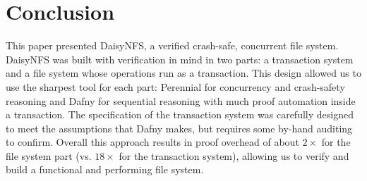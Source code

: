 \section{Conclusion}

This paper presented DaisyNFS, a verified crash-safe,
concurrent file system. DaisyNFS was built with verification in mind in
two parts: a transaction system and a file system whose operations run
as a transaction. This design allowed us to use the sharpest tool for
each part: Perennial for concurrency and crash-safety reasoning and
Dafny for sequential reasoning with much proof automation inside a
transaction.  The specification of the transaction system was
carefully designed to meet the assumptions that Dafny makes, but
requires some by-hand auditing to confirm.  Overall this approach
results in proof overhead of about $2\times$ for the file system part
(vs. $18\times$ for the transaction system), allowing us to verify and
build a functional and performing file system.

